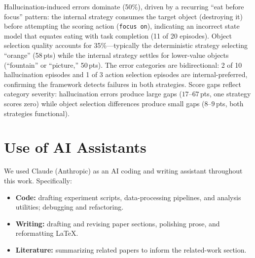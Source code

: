 \documentclass[11pt]{article}
\begin{document}
\noindent Hallucination-induced errors dominate (50\%), driven by a recurring ``eat before focus'' pattern: the internal strategy consumes the target object (destroying it) before attempting the scoring action (\texttt{focus on}), indicating an incorrect state model that equates eating with task completion (11 of 20 episodes). Object selection quality accounts for 35\%---typically the deterministic strategy selecting ``orange'' (58\,pts) while the internal strategy settles for lower-value objects (``fountain'' or ``picture,'' 50\,pts). The error categories are bidirectional: 2 of 10 hallucination episodes and 1 of 3 action selection episodes are internal-preferred, confirming the framework detects failures in both strategies. Score gaps reflect category severity: hallucination errors produce large gaps ($17$--$67$\,pts, one strategy scores zero) while object selection differences produce small gaps ($8$--$9$\,pts, both strategies functional).

\section{Use of AI Assistants}
\label{app:ai-assistants}

We used Claude (Anthropic) as an AI coding and writing assistant throughout this work. Specifically:
\begin{itemize}
    \item \textbf{Code:} drafting experiment scripts, data-processing pipelines, and analysis utilities; debugging and refactoring.
    \item \textbf{Writing:} drafting and revising paper sections, polishing prose, and reformatting \LaTeX{}.
    \item \textbf{Literature:} summarizing related papers to inform the related-work section.
\end{itemize}
\end{document}
